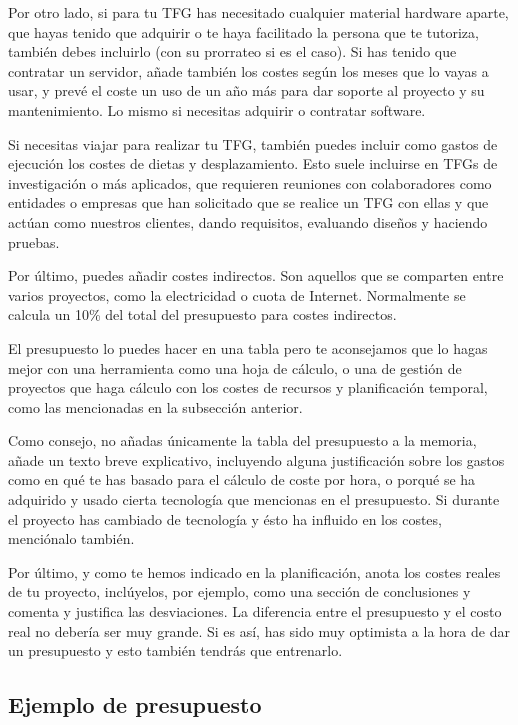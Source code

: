 Por otro lado, si para tu TFG has necesitado cualquier material hardware aparte, que hayas tenido que adquirir o te haya facilitado la persona que te tutoriza, también debes incluirlo (con su prorrateo si es el caso). Si has tenido que contratar un servidor, añade también los costes según los meses que lo vayas a usar, y prevé el coste un uso de un año más para dar soporte al proyecto y su mantenimiento. Lo mismo si necesitas adquirir o contratar software.

Si necesitas viajar para realizar tu TFG, también puedes incluir como gastos de ejecución los costes de dietas y desplazamiento. Esto suele incluirse en TFGs de investigación o más aplicados, que requieren reuniones con colaboradores como entidades o empresas que han solicitado que se realice un TFG con ellas y que actúan como nuestros clientes, dando requisitos, evaluando diseños y haciendo pruebas. 

Por último, puedes añadir costes indirectos. Son aquellos que se comparten entre varios proyectos, como la electricidad o cuota de Internet. Normalmente se calcula un 10\% del total del presupuesto para costes indirectos.

El presupuesto lo puedes hacer en una tabla pero te aconsejamos que lo hagas mejor con una herramienta como una hoja de cálculo, o una de gestión de proyectos que haga cálculo con los costes de recursos y planificación temporal, como las mencionadas en la subsección anterior.

Como consejo, no añadas únicamente la tabla del presupuesto a la memoria, añade un texto breve explicativo, incluyendo alguna justificación sobre los gastos como en qué te has basado para el cálculo de coste por hora, o porqué se ha adquirido y usado cierta tecnología que mencionas en el presupuesto. Si durante el proyecto has cambiado de tecnología y ésto ha influido en los costes, menciónalo también.

Por último, y como te hemos indicado en la planificación, anota los costes reales de tu proyecto, inclúyelos, por ejemplo, como una sección de conclusiones y comenta y justifica las desviaciones. La diferencia entre el presupuesto y el costo real no debería ser muy grande. Si es así, has sido muy optimista a la hora de dar un presupuesto y esto también tendrás que entrenarlo.

\subsection{Ejemplo de presupuesto}

